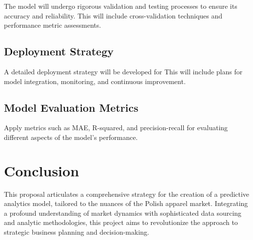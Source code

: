 \documentclass{article}
\begin{document}
The model will undergo rigorous validation and testing processes to ensure its accuracy and reliability. This will include cross-validation techniques and performance metric assessments.

\subsection{Deployment Strategy}

A detailed deployment strategy will be developed for  This will include plans for model integration, monitoring, and continuous improvement.


\subsection{Model Evaluation Metrics}
Apply metrics such as MAE, R-squared, and precision-recall for evaluating different aspects of the model's performance.


\section{Conclusion}
This proposal articulates a comprehensive strategy for the creation of a predictive analytics model, tailored to the nuances of the Polish apparel market. Integrating a profound understanding of market dynamics with sophisticated data sourcing and analytic methodologies, this project aims to revolutionize the approach to strategic business planning and decision-making.
\end{document}
